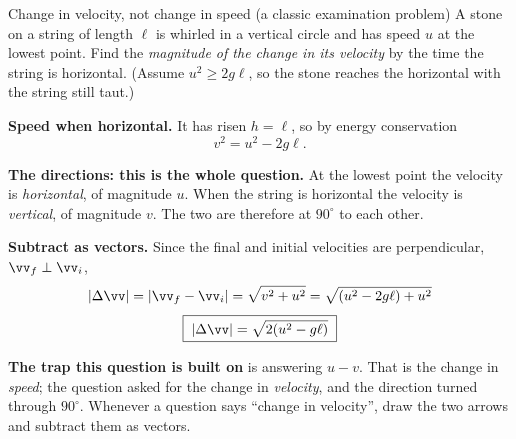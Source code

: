 \begin{exbox}{Change in velocity, not change in speed \textnormal{(a classic examination problem)}}
A stone on a string of length $\ell$ is whirled in a vertical circle and has speed $u$ at the lowest point.
Find the \emph{magnitude of the change in its velocity} by the time the string is horizontal. (Assume
$u^{2}\ge2g\ell$, so the stone reaches the horizontal with the string still taut.)

 \textbf{Speed when horizontal.} It has risen $h=\ell$, so by energy conservation
\[
v^{2}=u^{2}-2g\ell.
\]

 \textbf{The directions: this is the whole question.} At the lowest point the velocity is
\emph{horizontal}, of magnitude $u$. When the string is horizontal the velocity is \emph{vertical}, of
magnitude $v$. The two are therefore at $90^\circ$ to each other.

 \textbf{Subtract as vectors.} Since the final and initial velocities are perpendicular, $\vv_f\perp\vv_i$,
\[
|\Delta\vv|=|\vv_f-\vv_i|=\sqrt{v^{2}+u^{2}}=\sqrt{(u^{2}-2g\ell)+u^{2}}
\]
\[
\boxed{\;|\Delta\vv|=\sqrt{2(u^{2}-g\ell)}\;}
\]

\smallskip
\textbf{The trap this question is built on} is answering $u-v$. That is the change in \emph{speed}; the
question asked for the change in \emph{velocity}, and the direction turned through $90^\circ$. Whenever
a question says ``change in velocity'', draw the two arrows and subtract them as vectors.
\end{exbox}

\begin{figure}[htbp]
\centering
{}
\end{figure}

